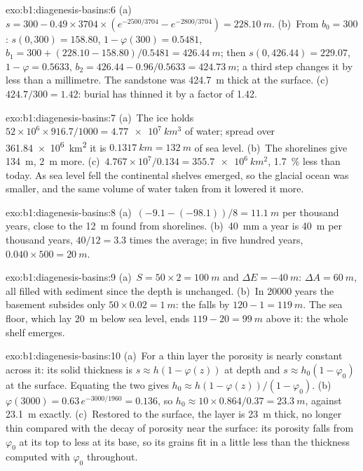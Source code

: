 \begin{solution}{exo:b1:diagenesis-basins:6}
(a)~$s = 300 - 0.49\times3704\times(e^{-2500/3704} - e^{-2800/3704}) =
\qty{228.10}{m}$. (b)~From $b_0 = 300$: $s(0, 300) = 158.80$, $1 - \varphi(300) =
0.5481$, $b_1 = 300 + (228.10 - 158.80)/0.5481 = \qty{426.44}{m}$; then
$s(0, 426.44) = 229.07$, $1 - \varphi = 0.5633$, $b_2 = 426.44 - 0.96/0.5633 =
\qty{424.73}{m}$; a third step changes it by less than a millimetre. The
sandstone was \qty{424.7}{m} thick at the surface. (c)~$424.7/300 = 1.42$: burial
has thinned it by a factor of \num{1.42}.
\end{solution}

\begin{solution}{exo:b1:diagenesis-basins:7}
(a)~The ice holds $52\times10^6\times916.7/1000 = \qty{4.77e7}{km^3}$ of water;
spread over \qty{361.84e6}{km^2} it is $\qty{0.1317}{km} = \qty{132}{m}$ of sea
level. (b)~The shorelines give \qty{134}{m}, \qty{2}{m} more. (c)~$4.767\times
10^7/0.134 = \qty{355.7e6}{km^2}$, \qty{1.7}{\%} less than today. As sea level
fell the continental shelves emerged, so the glacial ocean was smaller, and the
same volume of water taken from it lowered it more.
\end{solution}

\begin{solution}{exo:b1:diagenesis-basins:8}
(a)~$(-9.1 - (-98.1))/8 = \qty{11.1}{m}$ per thousand years, close to the
\qty{12}{m} found from shorelines. (b)~\qty{40}{mm} a year is \qty{40}{m} per
thousand years, $40/12 = 3.3$ times the average; in five hundred years,
$0.040\times500 = \qty{20}{m}$.
\end{solution}

\begin{solution}{exo:b1:diagenesis-basins:9}
(a)~$S = 50\times2 = \qty{100}{m}$ and $\Delta E = \qty{-40}{m}$:
$\Delta A = \qty{60}{m}$, all filled with sediment since the depth is unchanged.
(b)~In \num{20000} years the basement subsides only $50\times0.02 = \qty{1}{m}$:
the  falls by $120 - 1 = \qty{119}{m}$. The sea floor, which lay
\qty{20}{m} below sea level, ends $119 - 20 = \qty{99}{m}$ above it: the whole
shelf emerges.
\end{solution}

\begin{solution}{exo:b1:diagenesis-basins:10}
(a)~For a thin layer the porosity is nearly constant across it: its solid
thickness is $s \approx h(1 - \varphi(z))$ at depth and $s \approx h_0(1 -
\varphi_0)$ at the surface. Equating the two gives $h_0 \approx h(1 -
\varphi(z))/(1 - \varphi_0)$. (b)~$\varphi(3000) = 0.63\,e^{-3000/1960} =
0.136$, so $h_0 \approx 10\times0.864/0.37 = \qty{23.3}{m}$, against
\qty{23.1}{m} exactly. (c)~Restored to the surface, the layer is
\qty{23}{m} thick, no longer thin compared with the decay of porosity near the
surface: its porosity falls from $\varphi_0$ at its top to less at its base, so
its grains fit in a little less than the thickness computed with $\varphi_0$
throughout.
\end{solution}

